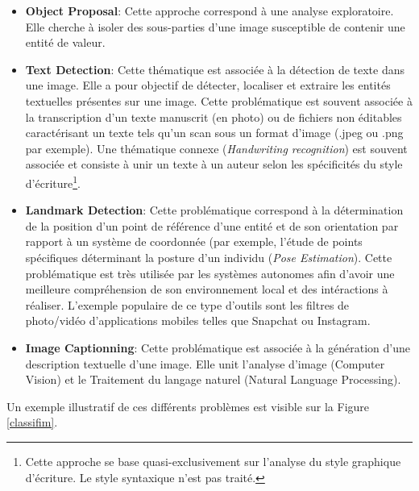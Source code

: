 \begin{itemize}
    \item \textbf{Object Proposal}: Cette approche correspond à une analyse exploratoire. Elle cherche à isoler des sous-parties d'une image susceptible de contenir une entité de valeur.

    \item \textbf{Text Detection}: Cette thématique est associée à la détection de texte dans une image. Elle a pour objectif de détecter, localiser et extraire les entités textuelles présentes sur une image. Cette problématique est souvent associée à la transcription d'un texte manuscrit (en photo) ou de fichiers non éditables caractérisant un texte tels qu'un scan sous un format d'image (.jpeg ou .png par exemple). Une thématique connexe (\textit{Handwriting recognition}) est souvent associée et consiste à unir un texte à un auteur selon les spécificités du style d'écriture\footnote{Cette approche se base quasi-exclusivement sur l'analyse du style graphique d'écriture. Le style syntaxique n'est pas traité.}.

    \item \textbf{Landmark Detection}: Cette problématique correspond à la détermination de la position d'un point de référence d'une entité et de son orientation par rapport à un système de coordonnée (par exemple, l'étude de points spécifiques déterminant la posture d'un individu (\textit{Pose Estimation}). Cette problématique est très utilisée par les systèmes autonomes afin d'avoir une meilleure compréhension de son environnement local et des intéractions à réaliser. L'exemple populaire de ce type d'outils sont les filtres de photo/vidéo d'applications mobiles telles que Snapchat ou Instagram.

    \item \textbf{Image Captionning}: Cette problématique est associée à la génération d'une description textuelle d'une image. Elle unit l'analyse d'image (Computer Vision) et le Traitement du langage naturel (Natural Language Processing).
\end{itemize}

\noindent Un exemple illustratif de ces différents problèmes est visible sur la Figure \ref{classifim}.

